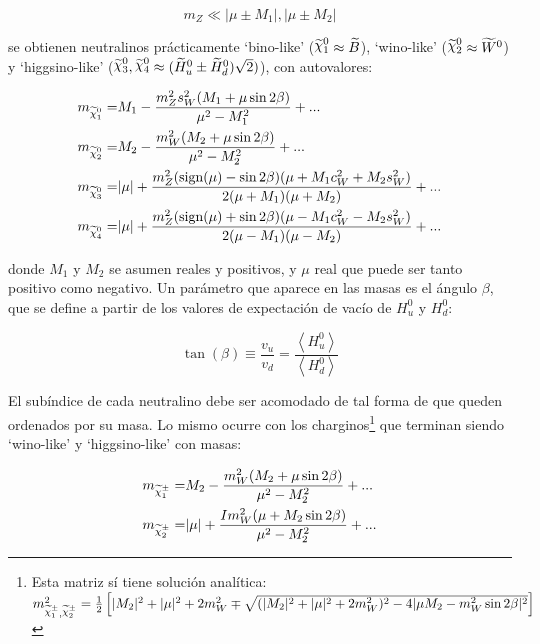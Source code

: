 \begin{equation}
	m_Z \ll |\mu \pm M_1|, |\mu \pm M_2|
\end{equation}

\noindent
se obtienen neutralinos prácticamente `bino-like' ($\ninoone \approx \widetilde{B}$), `wino-like' ($\ninotwo \approx \widetilde{W}^0$) y `higgsino-like' ($\ninothree, \ninofour \approx (\widetilde{H}_u^0 \pm \widetilde{H}_d^0)\sqrt{2})$), con autovalores:

\begin{equation}
	\begin{split}
		m_{\ninoone} = & M_1 - \frac{m_Z^2 s_W^2 (M_1 + \mu \sin{2\beta})}{\mu^2 - M_1^2} + ... \\
		m_{\ninotwo} = & M_2 - \frac{m_W^2 (M_2 + \mu \sin{2\beta})}{\mu^2 - M_2^2} + ... \\
		m_{\ninothree} = & |\mu| + \frac{m_Z^2 (\text{sign}(\mu) - \sin{2\beta})(\mu + M_1 c_W^2 + M_2 s_W^2)}{2 (\mu + M_1) (\mu + M_2)} + ... \\
		m_{\ninofour} = & |\mu| + \frac{m_Z^2 (\text{sign}(\mu) + \sin{2\beta})(\mu - M_1 c_W^2 - M_2 s_W^2)}{2 (\mu - M_1) (\mu - M_2)} + ... \\
	\end{split}
	\label{eq:nc_mass}
\end{equation}

\noindent
donde $M_1$ y $M_2$ se asumen reales y positivos, y $\mu$ real que puede ser tanto positivo como negativo. 
Un parámetro que aparece en las masas es el ángulo $\beta$, que se define a partir de los valores de expectación de vacío de $H_u^0$ y $H_d^0$:
	
\begin{equation}
	\tan(\beta) \equiv \frac{v_u}{v_d} = \frac{\left< H_u^0 \right>}{\left< H_d^0 \right>}
\end{equation}

El subíndice de cada neutralino debe ser acomodado de tal forma de que queden ordenados por su masa. Lo mismo ocurre con los charginos\footnote{Esta matriz sí tiene solución analítica: \\ $m_{\chinoonepm, \chinotwopm}^2 = \frac{1}{2} \left[ |M_2|^2 + |\mu|^2 + 2 m_W^2 \mp \sqrt{(|M_2|^2 + |\mu|^2 + 2 m_W^2)^2 - 4 |\mu M_2 - m_W^2 \sin{2\beta}|^2} \right]$} que terminan siendo `wino-like' y `higgsino-like' con masas:

\begin{equation}
	\begin{split}
		m_{\chinoonepm} = & M_2 - \frac{m_W^2 (M_2 + \mu \sin{2\beta})}{\mu^2 - M_2^2} + ... \\
		m_{\chinotwopm} = & |\mu| + \frac{I m_W^2 (\mu + M_2 \sin{2\beta})}{\mu^2 - M_2^2} + ... \\
	\end{split}
\end{equation}

